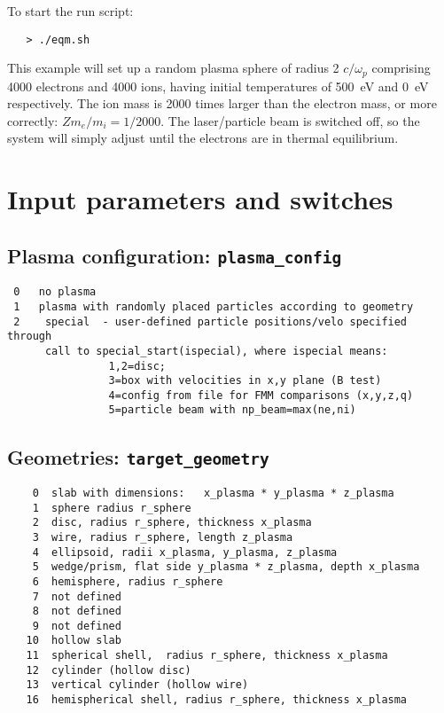 \documentclass[11pt,psfig]{article}
\begin{document}
\normalsize

\noindent
To start the run script:
\begin{verbatim}
   > ./eqm.sh
\end{verbatim}

\noindent
This example will set up a random plasma sphere of radius 2 $c/\omega_p$ comprising 4000 electrons and
4000 ions, having initial temperatures of 500~eV and 0~eV respectively. The
ion mass is 2000 times larger than the electron mass, or more correctly:
$Zm_e/m_i = 1/2000$.  The laser/particle beam is switched off, so the system
will simply adjust until the electrons are in thermal equilibrium.

\section{Input parameters and switches \label{inputs}}

\subsection{Plasma configuration:  {\tt plasma\_config}}
\begin{verbatim}
 0   no plasma
 1   plasma with randomly placed particles according to geometry
 2    special  - user-defined particle positions/velo specified through 
      call to special_start(ispecial), where ispecial means:
                1,2=disc;
                3=box with velocities in x,y plane (B test)
                4=config from file for FMM comparisons (x,y,z,q)
                5=particle beam with np_beam=max(ne,ni)
\end{verbatim}

\subsection{Geometries:  {\tt target\_geometry}}
\begin{verbatim}
    0  slab with dimensions:   x_plasma * y_plasma * z_plasma
    1  sphere radius r_sphere
    2  disc, radius r_sphere, thickness x_plasma
    3  wire, radius r_sphere, length z_plasma
    4  ellipsoid, radii x_plasma, y_plasma, z_plasma
    5  wedge/prism, flat side y_plasma * z_plasma, depth x_plasma
    6  hemisphere, radius r_sphere
    7  not defined
    8  not defined
    9  not defined 
   10  hollow slab
   11  spherical shell,  radius r_sphere, thickness x_plasma
   12  cylinder (hollow disc)
   13  vertical cylinder (hollow wire)
   16  hemispherical shell, radius r_sphere, thickness x_plasma

\end{verbatim}
\end{document}

